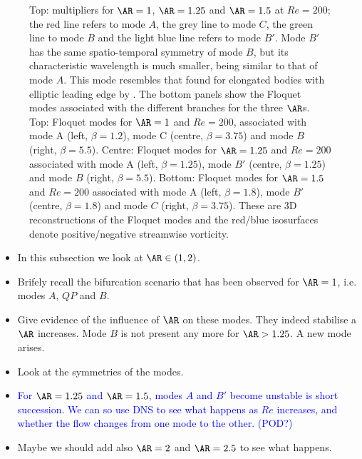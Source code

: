 \begin{figure}
  \caption{Top: multipliers for $\AR=1$, $\AR=1.25$ and $\AR=1.5$ at $Re=200$; the red line refers to mode $A$, the grey line to mode $C$, the green line to mode $B$ and the light blue line refers to mode $B'$. Mode $B'$ has the same spatio-temporal symmetry of mode $B$, but its characteristic wavelength is much smaller, being similar to that of mode $A$. This mode resembles that found for elongated bodies with elliptic leading edge by \cite{ryan-etal-2005}. The bottom panels show the Floquet modes associated with the different branches for the three $\AR$s. Top: Floquet modes for $\AR=1$ and $Re=200$, associated with mode A (left, $\beta=1.2$), mode C (centre, $\beta=3.75$) and mode $B$ (right, $\beta=5.5$). Centre: Floquet modes for $\AR=1.25$ and $Re=200$ associated with mode A (left, $\beta=1.25$), mode $B'$ (centre, $\beta = 1.25$) and mode $B$ (right, $\beta=5.5$). Bottom: Floquet modes for $\AR=1.5$ and $Re=200$ associated with mode A (left, $\beta=1.8$), mode $B'$ (centre, $\beta=1.8$) and mode $C$ (right, $\beta=3.75$). These are 3D reconstructions of the Floquet modes and the red/blue isosurfaces denote positive/negative streamwise vorticity.}
  \label{fig:xx}
\end{figure}

\begin{itemize}
  \item In this subsection we look at $\AR \in (1,2)$.
  \item Brifely recall the bifurcation scenario that has been observed for $\AR=1$, i.e. modes $A$, $QP$ and $B$.
  \item Give evidence of the influence of $\AR$ on these modes. They indeed stabilise a $\AR$ increases. Mode $B$ is not present any more for $\AR>1.25$. A new mode arises.
  \item Look at the symmetries of the modes.  
  \item \textcolor{blue}{For $\AR=1.25$ and $\AR=1.5$, modes $A$ and $B'$ become unstable is short succession. We can so use DNS to see what happens as $Re$ increases, and whether the flow changes from one mode to the other. (POD?)}
  \item Maybe we should add also $\AR=2$ and $\AR=2.5$ to see what happens.
\end{itemize}
